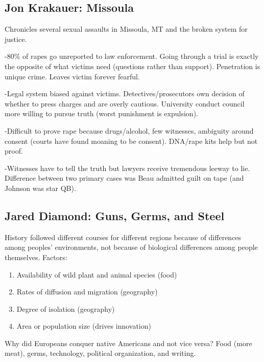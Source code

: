 \documentclass[
]{article}
\begin{document}
\hypertarget{jon-krakauer-missoula}{%
\subsection{Jon Krakauer: Missoula}\label{jon-krakauer-missoula}}

Chronicles several sexual assaults in Missoula, MT and the broken system
for justice.

-80\% of rapes go unreported to law enforcement. Going through a trial
is exactly the opposite of what victims need (questions rather than
support). Penetration is unique crime. Leaves victim forever fearful.

-Legal system biased against victims. Detectives/prosecutors own
decision of whether to press charges and are overly cautious. University
conduct council more willing to pursue truth (worst punishment is
expulsion).

-Difficult to prove rape because drugs/alcohol, few witnesses, ambiguity
around consent (courts have found moaning to be consent). DNA/rape kits
help but not proof.

-Witnesses have to tell the truth but lawyers receive tremendous leeway
to lie. Difference between two primary cases was Beau admitted guilt on
tape (and Johnson was star QB).

\hypertarget{jared-diamond-guns-germs-and-steel}{%
\subsection{Jared Diamond: Guns, Germs, and
Steel}\label{jared-diamond-guns-germs-and-steel}}

History followed different courses for different regions because of
differences among peoples' environments, not because of biological
differences among people themselves. Factors:

\begin{enumerate}
\def\labelenumi{\arabic{enumi}.}
\item
  Availability of wild plant and animal species (food)
\item
  Rates of diffusion and migration (geography)
\item
  Degree of isolation (geography)
\item
  Area or population size (drives innovation)
\end{enumerate}

Why did Europeans conquer native Americans and not vice versa? Food
(more meat), germs, technology, political organization, and writing.
\end{document}
